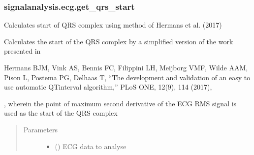 \documentclass[letterpaper,10pt,english]{sphinxmanual}
\begin{document}
\subsubsection{signalanalysis.ecg.get\_qrs\_start}
\label{\detokenize{_autosummary/signalanalysis.ecg.get_qrs_start:signalanalysis-ecg-get-qrs-start}}\label{\detokenize{_autosummary/signalanalysis.ecg.get_qrs_start::doc}}

\begin{fulllineitems}
\label{\detokenize{_autosummary/signalanalysis.ecg.get_qrs_start:signalanalysis.ecg.get_qrs_start}}
\sphinxAtStartPar
Calculates start of QRS complex using method of Hermans et al. (2017)

\sphinxAtStartPar
Calculates the start of the QRS complex by a simplified version of the work presented in \sphinxstepexplicit %
\begin{footnote}[1]\label{\thesphinxscope.1}%
\sphinxAtStartFootnote
Hermans BJM, Vink AS, Bennis FC, Filippini LH, Meijborg VMF, Wilde AAM, Pison L, Postema PG, Delhaas T,
“The development and validation of an easy to use automatic QT\sphinxhyphen{}interval algorithm,”
PLoS ONE, 12(9), 1\textendash{}14 (2017), 
%
\end{footnote}, wherein the point of
maximum second derivative of the ECG RMS signal is used as the start of the QRS complex
\begin{quote}\begin{description}
\item[{Parameters}] \leavevmode\begin{itemize}
\item {} 
\sphinxAtStartPar
{} () \textendash{} ECG data to analyse


\end{itemize}
\end{description}
\end{quote}
\end{fulllineitems}
\end{document}
